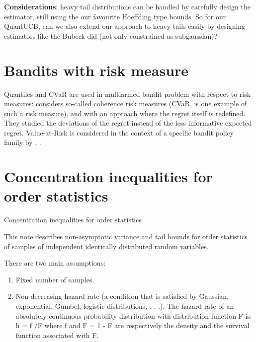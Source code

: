 \documentclass{article}
\begin{document}
\textbf{Considerations}: heavy tail distributions can be handled by carefully design the estimator, still using the our favourite  Hoeffding type bounds. So for our QuantUCB, can we also extend our approach to heavy tails easily by designing estimators like the Bubeck did (not only constrained as subgaussian)? 

\section{Bandits with risk measure}
Quantiles and CVaR are used in multiarmed bandit problem with respect to risk measures:\cite{Maillard2013}  considers so-called coherence risk measures (CVaR, is one example of such a risk measure), and with an approach where the regret itself is redefined. They studied the deviations of the regret instead of the less informative expected regret.
Value-at-Risk is considered in the context of a specific bandit policy family by \cite{Audibert2007}, \cite{AUDIBERT20091876}.

\section{Concentration inequalities for order statistics}

Concentration inequalities for order statistics \cite{boucheron2012}


This note describes non-asymptotic variance and tail bounds for order statistics of samples of independent identically distributed random variables.

There are two main assumptions: 
\begin{enumerate}
    \item Fixed number of samples.
    \item Non-decreasing hazard rate (a condition that is satisfied by Gaussian, exponential, Gumbel, logistic distributions, . . .). The hazard rate of an absolutely continuous probability distribution with distribution function F is: h = f /F where f and F = 1 - F are respectively the density and the survival function associated with F.
\end{enumerate}
\end{document}

